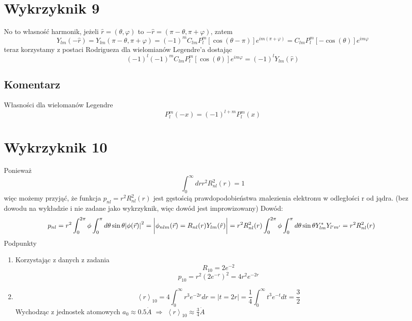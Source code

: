 \documentclass[a4paper,12pt]{article}
\begin{document}
\section{Wykrzyknik 9}
No to własność harmonik, jeżeli $\hat{r} = (\theta,\varphi)$ to $-\hat{r} = (\pi-\theta,\pi+\varphi)$, zatem
$$
	Y_{lm}(-\hat{r}) = Y_{lm}(\pi-\theta,\pi+\varphi) = (-1)^m C_{lm} P^m_l[\cos(\theta-\pi)]e^{im(\pi+\varphi)} = C_{lm} P^m_l[-\cos(\theta)]e^{im\varphi}
$$
teraz korzystamy z postaci Rodrigueza dla wielomianów Legendre'a dostając
$$
	(-1)^l (-1)^m C_{lm} P^m_l[\cos(\theta)]e^{im\varphi} = (-1)^l Y_{lm}(\hat{r})
$$
\subsection{Komentarz}
	Własności dla wielomanów Legendre
	$$
		P_l^m (-x) = (-1)^{l+m} P_l^m(x)
	$$
\section{Wykrzyknik 10}
Ponieważ 
\[
  \int_0^\infty dr r^2 R_{nl}^2(r) = 1
\]
więc możemy przyjąć, że funkcja $p_{nl} = r^2R_{nl}^2(r)$ jest gęstością
prawdopodobieństwa znalezienia elektronu w odległości r od jądra. (bez dowodu
na wykładzie i nie zadane jako wykrzyknik, więc dowód jest improwizowany)
Dowód:
\[
  p_{nl} = r^2 \int_0^{2\pi}\phi\int_0^\pi d\theta\sin\theta
  \abs{\phi(\vec{r})}^2 = \bigg\vert \phi_{nlm} (\vec{r}) =
  R_{nl}(r)Y_{lm}(\hat{r}) \bigg\vert =
  r^2R_{nl}^2(r)\int_0^{2\pi}\phi\int_0^\pi d\theta\sin\theta Y^*_{lm} Y_{l'm'}
  = r^2 R_{nl}^2(r)
  \
\]
Podpunkty
\begin{enumerate}[label=(\alph*)]
  \item Korzystając z danych z zadania
    \[
      R_{10} = 2e^{-2}
    \]
    \[
      p_{10} = r^2(2e^{-r})^2 = 4r^2 e^{-2r}
    \]
  \item
    \[
      \left< r \right>_{10} = 4 \int_0^\infty r^3 e^{-2r} dr = \bigg \vert t =
      2r \bigg \vert = \frac{1}{4} \int_0^\infty t^3 e^{-t} dt = \frac{3}{2}
    \]
    Wychodząc z jednostek atomowych $a_0 \approx 0.5 \dot{A}$ $\Rightarrow$
    $\left< r \right>_{10} \approx \frac{3}{4} \dot{A}$
\end{enumerate}
\end{document}
